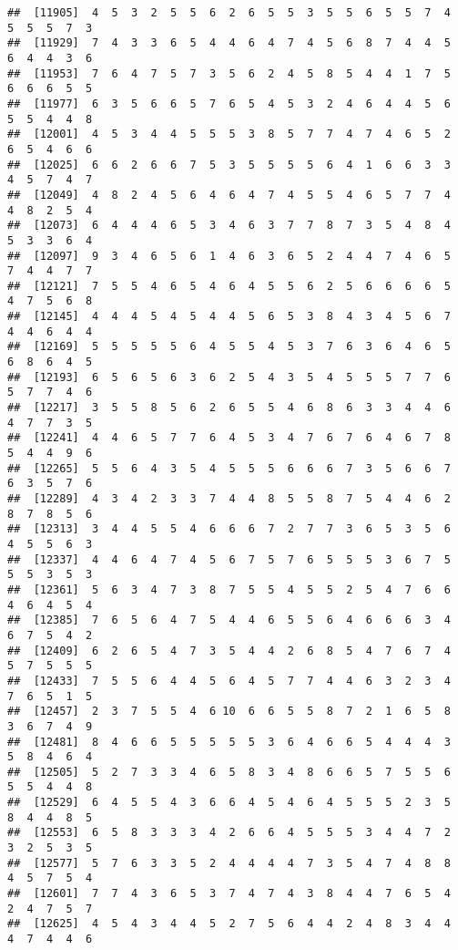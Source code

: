 \documentclass[
]{book}
\begin{document}
\begin{verbatim}
##  [11905]  4  5  3  2  5  5  6  2  6  5  5  3  5  5  6  5  5  7  4  5  5  5  7  3
##  [11929]  7  4  3  3  6  5  4  4  6  4  7  4  5  6  8  7  4  4  5  6  4  4  3  6
##  [11953]  7  6  4  7  5  7  3  5  6  2  4  5  8  5  4  4  1  7  5  6  6  6  5  5
##  [11977]  6  3  5  6  6  5  7  6  5  4  5  3  2  4  6  4  4  5  6  5  5  4  4  8
##  [12001]  4  5  3  4  4  5  5  5  3  8  5  7  7  4  7  4  6  5  2  6  5  4  6  6
##  [12025]  6  6  2  6  6  7  5  3  5  5  5  5  6  4  1  6  6  3  3  4  5  7  4  7
##  [12049]  4  8  2  4  5  6  4  6  4  7  4  5  5  4  6  5  7  7  4  4  8  2  5  4
##  [12073]  6  4  4  4  6  5  3  4  6  3  7  7  8  7  3  5  4  8  4  5  3  3  6  4
##  [12097]  9  3  4  6  5  6  1  4  6  3  6  5  2  4  4  7  4  6  5  7  4  4  7  7
##  [12121]  7  5  5  4  6  5  4  6  4  5  5  6  2  5  6  6  6  6  5  4  7  5  6  8
##  [12145]  4  4  4  5  4  5  4  4  5  6  5  3  8  4  3  4  5  6  7  4  4  6  4  4
##  [12169]  5  5  5  5  5  6  4  5  5  4  5  3  7  6  3  6  4  6  5  6  8  6  4  5
##  [12193]  6  5  6  5  6  3  6  2  5  4  3  5  4  5  5  5  7  7  6  5  7  7  4  6
##  [12217]  3  5  5  8  5  6  2  6  5  5  4  6  8  6  3  3  4  4  6  4  7  7  3  5
##  [12241]  4  4  6  5  7  7  6  4  5  3  4  7  6  7  6  4  6  7  8  5  4  4  9  6
##  [12265]  5  5  6  4  3  5  4  5  5  5  6  6  6  7  3  5  6  6  7  6  3  5  7  6
##  [12289]  4  3  4  2  3  3  7  4  4  8  5  5  8  7  5  4  4  6  2  8  7  8  5  6
##  [12313]  3  4  4  5  5  4  6  6  6  7  2  7  7  3  6  5  3  5  6  4  5  5  6  3
##  [12337]  4  4  6  4  7  4  5  6  7  5  7  6  5  5  5  3  6  7  5  5  5  3  5  3
##  [12361]  5  6  3  4  7  3  8  7  5  5  4  5  5  2  5  4  7  6  6  4  6  4  5  4
##  [12385]  7  6  5  6  4  7  5  4  4  6  5  5  6  4  6  6  6  3  4  6  7  5  4  2
##  [12409]  6  2  6  5  4  7  3  5  4  4  2  6  8  5  4  7  6  7  4  5  7  5  5  5
##  [12433]  7  5  5  6  4  4  5  6  4  5  7  7  4  4  6  3  2  3  4  7  6  5  1  5
##  [12457]  2  3  7  5  5  4  6 10  6  6  5  5  8  7  2  1  6  5  8  3  6  7  4  9
##  [12481]  8  4  6  6  5  5  5  5  5  3  6  4  6  6  5  4  4  4  3  5  8  4  6  4
##  [12505]  5  2  7  3  3  4  6  5  8  3  4  8  6  6  5  7  5  5  6  5  5  4  4  8
##  [12529]  6  4  5  5  4  3  6  6  4  5  4  6  4  5  5  5  2  3  5  8  4  4  8  5
##  [12553]  6  5  8  3  3  3  4  2  6  6  4  5  5  5  3  4  4  7  2  3  2  5  3  5
##  [12577]  5  7  6  3  3  5  2  4  4  4  4  7  3  5  4  7  4  8  8  4  5  7  5  4
##  [12601]  7  7  4  3  6  5  3  7  4  7  4  3  8  4  4  7  6  5  4  2  4  7  5  7
##  [12625]  4  5  4  3  4  4  5  2  7  5  6  4  4  2  4  8  3  4  4  4  7  4  4  6

\end{verbatim}
\end{document}
